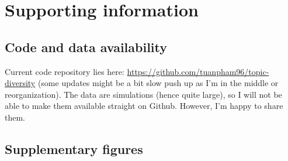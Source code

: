\section{Supporting information}

\subsection*{Code and data availability}

Current code repository lies here: \url{https://github.com/tuanpham96/topic-diversity} (some updates might be a bit slow push up as I'm in the middle or reorganization). The data are simulations (hence quite large), so I will not be able to make them available straight on Github. However, I'm happy to share them.

\subsection*{Supplementary figures}

\setcounter{figure}{0}
\renewcommand{\thefigure}{S\arabic{figure}}









